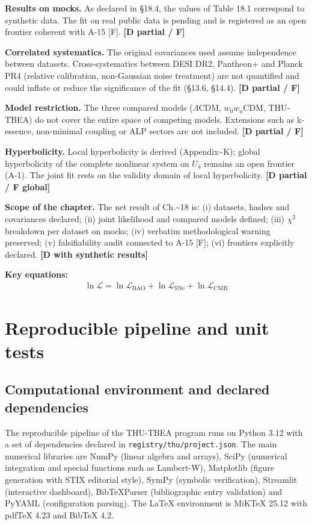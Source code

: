 ﻿\documentclass[11pt,letterpaper]{article}
\begin{document}
\textbf{Results on mocks.} As declared in §18.4, the values of Table 18.1 correspond to synthetic data. The fit on real public data is pending and is registered as an open frontier coherent with A-15 [F]. \textbf{[D partial / F]}

\textbf{Correlated systematics.} The original covariances used assume independence between datasets. Cross-systematics between DESI DR2, Pantheon+ and Planck PR4 (relative calibration, non-Gaussian noise treatment) are not quantified and could inflate or reduce the significance of the fit (§13.6, §14.4). \textbf{[D partial / F]}

\textbf{Model restriction.} The three compared models ($\Lambda$CDM, $w_0w_a$CDM, THU-TBEA) do not cover the entire space of competing models. Extensions such as k-essence, non-minimal coupling or ALP sectors are not included. \textbf{[D partial / F]}

\textbf{Hyperbolicity.} Local hyperbolicity is derived (Appendix\textasciitilde{}K); global hyperbolicity of the complete nonlinear system on $U_4$ remains an open frontier (A-1). The joint fit rests on the validity domain of local hyperbolicity. \textbf{[D partial / F global]}

\textbf{Scope of the chapter.} The net result of Ch.\textasciitilde{}18 is: (i) datasets, hashes and covariances declared; (ii) joint likelihood and compared models defined; (iii) $\chi^2$ breakdown per dataset on mocks; (iv) verbatim methodological warning preserved; (v) falsifiability audit connected to A-15 [F]; (vi) frontiers explicitly declared. \textbf{[D with synthetic results]}

\textbf{Key equations:}
\begin{align*}
    \ln\mathcal{L} = \ln\mathcal{L}_{\mathrm{BAO}} + \ln\mathcal{L}_{\mathrm{SNe}} + \ln\mathcal{L}_{\mathrm{CMB}}
\end{align*}
\section{Reproducible pipeline and unit tests}
\subsection{Computational environment and declared dependencies}
The reproducible pipeline of the THU-TBEA program runs on Python 3.12 with a set of dependencies declared in \texttt{registry/thu/project.json}. The main numerical libraries are NumPy (linear algebra and arrays), SciPy (numerical integration and special functions such as Lambert-W), Matplotlib (figure generation with STIX editorial style), SymPy (symbolic verification), Streamlit (interactive dashboard), BibTeXParser (bibliographic entry validation) and PyYAML (configuration parsing). The LaTeX environment is MiKTeX 25.12 with pdfTeX 4.23 and BibTeX 4.2.
\end{document}
